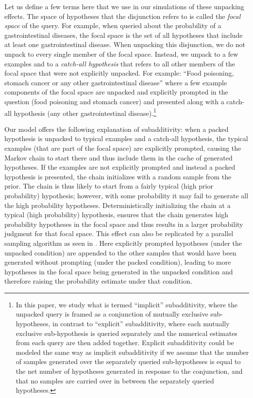 Let us define a few terms here that we use in our simulations of these unpacking effects. The space of hypotheses that the disjunction refers to is called the \textit{focal space} of the query. For example, when queried about the probability of a gastrointestinal diseases, the focal space is the set of all hypotheses that include at least one gastrointestinal disease. When unpacking this disjunction, we do not unpack to every single member of the focal space. Instead, we unpack to a few examples and to a \emph{catch-all hypothesis} that refers to all other members of the focal space that were not explicitly unpacked. 
For example: ``Food poisoning, stomach cancer or any other gastrointestinal disease'' where a few example components of the focal space are unpacked and explicitly prompted in the question (food poisoning and stomach cancer) and presented along with a catch-all hypothesis (any other gastrointestinal disease).\footnote{In this paper, we study what is termed ``implicit'' subadditivity, where the unpacked query is framed as a conjunction of mutually exclusive sub-hypotheses, in contrast to ``explicit'' subadditivity, where each mutually exclusive sub-hypothesis is queried separately and the numerical estimates from each query are then added together. Explicit subadditivity could be modeled the same way as implicit subadditivity if we assume that the number of samples generated over the separately queried sub-hypotheses is equal to the net number of hypotheses generated in response to the conjunction, and that no samples are carried over in between the separately queried hypotheses.}

Our model offers the following explanation of subadditivity: when a packed hypothesis is unpacked to typical examples and a catch-all hypothesis, the typical examples (that are part of the focal space) are explicitly prompted, causing the Markov chain to start there and thus include them in the cache of generated hypotheses.
If the examples are not explicitly prompted and instead a packed hypothesis is presented, the chain initializes with a random sample from the prior. The chain is thus likely to start from a fairly typical (high prior probability) hypothesis; however, with some probability it may fail to generate all the high probability hypotheses. Deterministically initializing the chain at a typical (high probability) hypothesis, ensures that the chain generates high probability hypotheses in the focal space and thus results in a larger probability judgment for that focal space.
This effect can also be replicated by a parallel sampling algorithm as seen in \cite{Thomas2008}. Here explicitly prompted hypotheses (under the unpacked condition) are appended to the other samples that would have been generated without prompting (under the packed condition), leading to more hypotheses in the focal space being generated in the unpacked condition and therefore raising the probability estimate under that condition.

